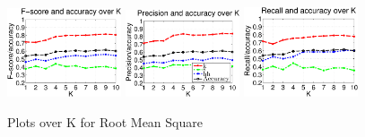 \begin{figure}

	\centering\includegraphics[width=0.3\textwidth]{tex/appendices/test/rms11FP.png}
	\centering\includegraphics[width=0.3\textwidth]{tex/appendices/test/rms11_P.png}
	\centering\includegraphics[width=0.3\textwidth]{tex/appendices/test/rms11_R.png}
	
	\caption{Plots over K for Root Mean Square}
\end{figure}


